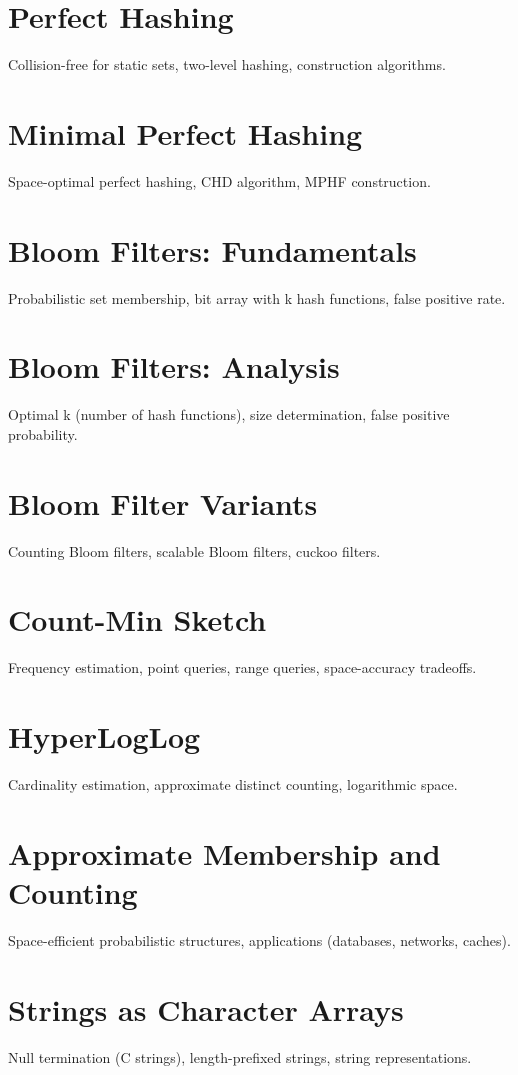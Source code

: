 \chapter{Perfect Hashing}
Collision-free for static sets, two-level hashing, construction algorithms.

\chapter{Minimal Perfect Hashing}
Space-optimal perfect hashing, CHD algorithm, MPHF construction.

\chapter{Bloom Filters: Fundamentals}
Probabilistic set membership, bit array with k hash functions, false positive rate.

\chapter{Bloom Filters: Analysis}
Optimal k (number of hash functions), size determination, false positive probability.

\chapter{Bloom Filter Variants}
Counting Bloom filters, scalable Bloom filters, cuckoo filters.

\chapter{Count-Min Sketch}
Frequency estimation, point queries, range queries, space-accuracy tradeoffs.

\chapter{HyperLogLog}
Cardinality estimation, approximate distinct counting, logarithmic space.

\chapter{Approximate Membership and Counting}
Space-efficient probabilistic structures, applications (databases, networks, caches).


\chapter{Strings as Character Arrays}
Null termination (C strings), length-prefixed strings, string representations.

